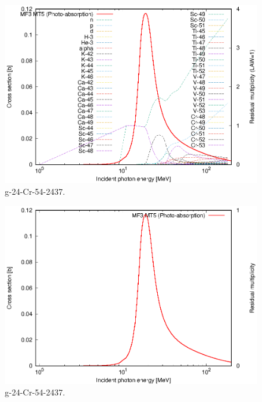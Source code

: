 \begin{figure}
 \includegraphics[width=\linewidth]{eps/g_24-Cr-54_2437.eps}
  \caption{g-24-Cr-54-2437.}
\end{figure}
\begin{figure}
 \includegraphics[width=\linewidth]{eps-law0/g_24-Cr-54_2437.eps}
 \caption{g-24-Cr-54-2437.}
\end{figure}
\newpage \clearpage

